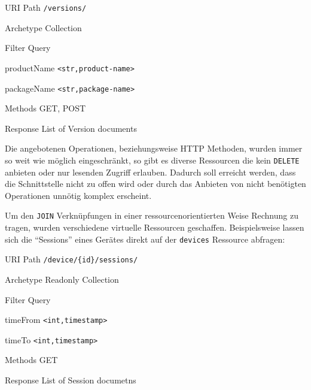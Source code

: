 \begin{mdframed}[style=def]
\begin{description*}
	\item[URI Path] \texttt{/versions/}
	\item[Archetype] Collection
	\item[Filter Query] \hfill
	\begin{description*}
		\item[productName] \texttt{<str,product-name>}
		\item[packageName] \texttt{<str,package-name>}
	\end{description*}
	\item[Methods] GET, POST
	\item[Response] List of Version documents
\end{description*}
\end{mdframed}

Die angebotenen Operationen, beziehungsweise HTTP Methoden, wurden immer so weit
wie möglich eingeschränkt, so gibt es diverse Ressourcen die kein
\texttt{DELETE} anbieten oder nur lesenden Zugriff erlauben. Dadurch soll
erreicht werden, dass die Schnittstelle nicht zu offen wird oder durch das
Anbieten von nicht benötigten Operationen unnötig komplex erscheint.

Um den \texttt{JOIN} Verknüpfungen in einer ressourcenorientierten Weise
Rechnung zu tragen, wurden verschiedene virtuelle Ressourcen geschaffen.
Beispielsweise lassen sich die \enquote{Sessions} eines Gerätes direkt auf der
\texttt{devices} Ressource abfragen:

\begin{mdframed}[style=def]
\begin{description*}
	\item[URI Path] \texttt{/device/\{id\}/sessions/}
	\item[Archetype] Readonly Collection
	\item[Filter Query] \hfill
	\begin{description*}
		\item[timeFrom] \texttt{<int,timestamp>}
		\item[timeTo] \texttt{<int,timestamp>}
	\end{description*}	
	\item[Methods] GET
	\item[Response] List of Session documetns
\end{description*}
\end{mdframed}

